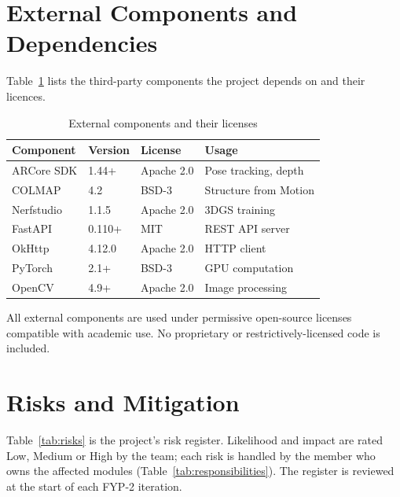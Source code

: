 \section{External Components and Dependencies}

Table~\ref{tab:dependencies} lists the third-party components the project depends on and their licences.

\begin{table}[htbp]
\centering
\small
\caption{External components and their licenses}
\label{tab:dependencies}
\begin{tabular}{p{3.5cm}p{2cm}p{2.5cm}p{3cm}}
\toprule
\textbf{Component} & \textbf{Version} & \textbf{License} & \textbf{Usage} \\
\midrule
ARCore SDK & 1.44+ & Apache 2.0 & Pose tracking, depth \\
COLMAP & 4.2 & BSD-3 & Structure from Motion \\
Nerfstudio & 1.1.5 & Apache 2.0 & 3DGS training \\
FastAPI & 0.110+ & MIT & REST API server \\
OkHttp & 4.12.0 & Apache 2.0 & HTTP client \\
PyTorch & 2.1+ & BSD-3 & GPU computation \\
OpenCV & 4.9+ & Apache 2.0 & Image processing \\
\bottomrule
\end{tabular}
\end{table}

All external components are used under permissive open-source licenses compatible with academic use. No proprietary or restrictively-licensed code is included.

\section{Risks and Mitigation}

Table~\ref{tab:risks} is the project's risk register. Likelihood and impact are rated Low, Medium or High by the team; each risk is handled by the member who owns the affected modules (Table~\ref{tab:responsibilities}). The register is reviewed at the start of each FYP-2 iteration.

